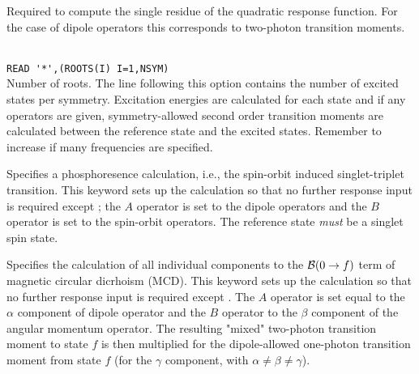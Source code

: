 \begin{description}

\item{}
Required to
compute the single residue of the quadratic
response function.
For the case of dipole operators this corresponds to two-photon
transition
moments.

\item{}\\
\verb|READ '*',(ROOTS(I) I=1,NSYM)|\\
Number of roots.  The line following this option contains the number
of excited states per symmetry. Excitation
energies are calculated for each state and if
any operators are given, 
symmetry-allowed second order transition moments are
calculated between the 
reference state and the excited states.
Remember to increase  if many frequencies are specified.

\item{}
Specifies a phosphoresence calculation, i.e.,
the spin-orbit 
induced singlet-triplet transition. This keyword sets up the  
calculation so that no further response input is required except ; the
$A$ operator is set to the dipole operators and
the $B$ operator  
is set to the spin-orbit
operators. \cite{ovhapjhjajthjojcp97,haovbmaqc27} 
The reference state {\em must} be a singlet spin state.

\item{}
Specifies the calculation of all individual components to the 
${\cal{B}}(0\to f)$ term of magnetic circular dicrhoism
(MCD).
This keyword sets up the calculation so that no further response input is required except . 
The $A$ operator is set equal to the $\alpha$ component of dipole 
operator and
the $B$ operator to the $\beta$ component of the angular momentum
operator. The resulting "mixed" two-photon transition moment to state $f$ 
is then multiplied for the dipole-allowed one-photon transition moment 
from state $f$ (for the $\gamma$ component, with $\alpha \neq \beta \neq \gamma$).
\cite{Coriani:MCDRSP} 


\end{description}
